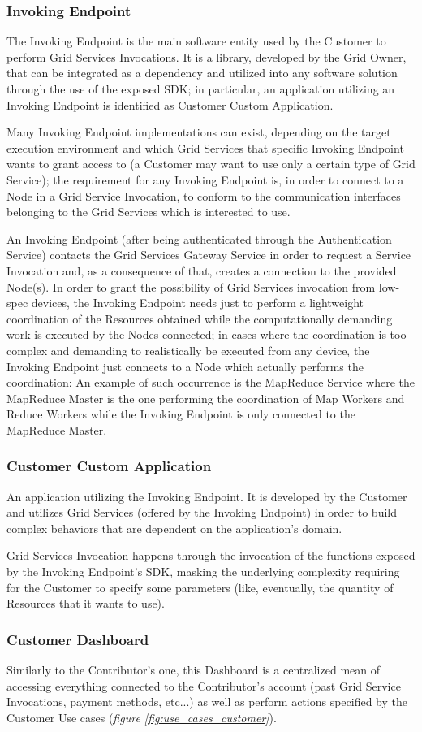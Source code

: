 \subsubsection{Invoking Endpoint}
The Invoking Endpoint is the main software entity used by the Customer to perform Grid Services Invocations. It is a library, developed by the Grid Owner, that can be integrated as a dependency and utilized into any software solution through the use of the exposed SDK; in particular, an application utilizing an Invoking Endpoint is identified as Customer Custom Application.

Many Invoking Endpoint implementations can exist, depending on the target execution environment and which Grid Services that specific Invoking Endpoint wants to grant access to (a Customer may want to use only a certain type of Grid Service); the requirement for any Invoking Endpoint is, in order to connect to a Node in a Grid Service Invocation, to conform to the communication interfaces belonging to the Grid Services which is interested to use.

An Invoking Endpoint (after being authenticated through the Authentication Service) contacts the Grid Services Gateway Service in order to request a Service Invocation and, as a consequence of that, creates a connection to the provided Node(s). In order to grant the possibility of Grid Services invocation from low-spec devices, the Invoking Endpoint needs just to perform a lightweight coordination of the Resources obtained while the computationally demanding work is executed by the Nodes connected; in cases where the coordination is too complex and demanding to realistically be executed from any device, the Invoking Endpoint just connects to a Node which actually performs the coordination: An example of such occurrence is the MapReduce Service where the MapReduce Master is the one performing the coordination of Map Workers and Reduce Workers while the Invoking Endpoint is only connected to the MapReduce Master.

\subsubsection{Customer Custom Application}
An application utilizing the Invoking Endpoint. It is developed by the Customer and utilizes Grid Services (offered by the Invoking Endpoint) in order to build complex behaviors that are dependent on the application's domain.

Grid Services Invocation happens through the invocation of the functions exposed by the Invoking Endpoint's SDK, masking the underlying complexity requiring for the Customer to specify some parameters (like, eventually, the quantity of Resources that it wants to use).

\subsubsection{Customer Dashboard}
Similarly to the Contributor's one, this Dashboard is a centralized mean of accessing everything connected to the Contributor's account (past Grid Service Invocations, payment methods, etc...) as well as perform actions specified by the Customer Use cases (\textit{figure \ref{fig:use_cases_customer}}).

